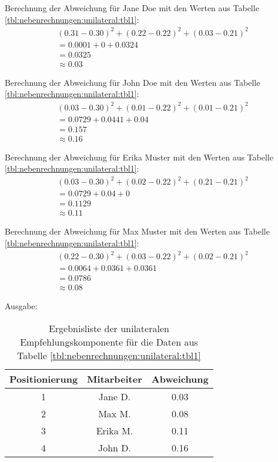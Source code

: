 Berechnung der Abweichung für Jane Doe mit den Werten aus Tabelle \ref{tbl:nebenrechnungen:unilateral:tbl1}:
\begin{gather}
	\nonumber (0.31-0.30)^2 + (0.22-0.22)^2 + (0.03-0.21)^2\\
	\nonumber = 0.0001 + 0 + 0.0324\\
	\nonumber = 0.0325\\
	\approx 0.03
	\label{frml:nebenrechnungen:unilateral:jane}
\end{gather}

Berechnung der Abweichung für John Doe mit den Werten aus Tabelle \ref{tbl:nebenrechnungen:unilateral:tbl1}:
\begin{gather}
	\nonumber (0.03-0.30)^2 + (0.01-0.22)^2 + (0.01-0.21)^2\\
	\nonumber = 0.0729 + 0.0441 + 0.04\\
	\nonumber = 0.157\\
	\approx 0.16
	\label{frml:nebenrechnungen:unilateral:john}
\end{gather}

Berechnung der Abweichung für Erika Muster mit den Werten aus Tabelle \ref{tbl:nebenrechnungen:unilateral:tbl1}:
\begin{gather}
	\nonumber (0.03-0.30)^2 + (0.02-0.22)^2 + (0.21-0.21)^2\\
	\nonumber = 0.0729 + 0.04 + 0\\
	\nonumber = 0.1129\\
	\approx 0.11
	\label{frml:nebenrechnungen:unilateral:erika}
\end{gather}

Berechnung der Abweichung für Max Muster mit den Werten aus Tabelle \ref{tbl:nebenrechnungen:unilateral:tbl1}:
\begin{gather}
	\nonumber (0.22-0.30)^2 + (0.03-0.22)^2 + (0.02-0.21)^2\\
	\nonumber = 0.0064 + 0.0361 + 0.0361\\
	\nonumber = 0.0786\\
	\approx 0.08
	\label{frml:nebenrechnungen:unilateral:max}
\end{gather}

Ausgabe:
\begin{table}[h]
	\centering
	\begin{tabular}{c|c|c}
		Positionierung & Mitarbeiter & Abweichung\\
		\hline
		1 & Jane D.  & 0.03\\
		2 & Max M.   & 0.08\\
		3 & Erika M. & 0.11\\
		4 & John D.  & 0.16
	\end{tabular}
	\caption{Ergebnisliste der unilateralen Empfehlungskomponente für die Daten aus Tabelle \ref{tbl:nebenrechnungen:unilateral:tbl1}}
	\label{tbl:nebenrechnungen:unilateral:ausgabe}
\end{table}